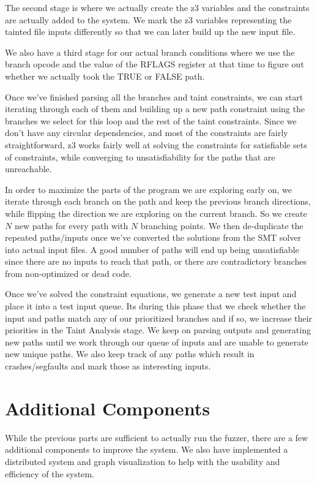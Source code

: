 The second stage is where we actually create the z3 variables and the
constraints are actually added to the system. We mark the z3 variables
representing the tainted file inputs differently so that we can later build up
the new input file.

We also have a third stage for our actual branch conditions where we use the
branch opcode and the value of the RFLAGS register at that time to figure out
whether we actually took the TRUE or FALSE path.

Once we've finished parsing all the branches and taint constraints, we can start
iterating through each of them and building up a new path constraint using the
branches we select for this loop and the rest of the taint constraints. Since we
don't have any circular dependencies, and most of the constraints are fairly
straightforward, z3 works fairly well at solving the constraints for satisfiable
sets of constraints, while converging to unsatisfiability for the paths that are
unreachable.

In order to maximize the parts of the program we are exploring early on, we
iterate through each branch on the path and keep the previous branch directions,
while flipping the direction we are exploring on the current branch. So we
create $N$ new paths for every path with $N$ branching points. We then
de-duplicate the repeated paths/inputs once we've converted the solutions from
the SMT solver into actual input files. A good number of paths will end up being
unsatisfiable since there are no inputs to reach that path, or there are
contradictory branches from non-optimized or dead code.

Once we've solved the constraint equations, we generate a new test input and
place it into a test input queue. Its during this phase that we check whether
the input and paths match any of our prioritized branches and if so, we increase
their priorities in the Taint Analysis stage. We keep on parsing outputs and
generating new paths until we work through our queue of inputs and are unable to
generate new unique paths. We also keep track of any paths which result in
crashes/segfaults and mark those as interesting inputs.

\section{Additional Components}
While the previous parts are sufficient to actually run the fuzzer, there are
a few additional components to improve the system. We also have implemented a
distributed system and graph visualization to help with the usability and
efficiency of the system.

